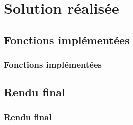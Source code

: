 \section{Solution r\'ealis\'ee}

\subsection{Fonctions impl\'ement\'ees}
\frame
{
\frametitle{Fonctions impl\'ement\'ees}


}

\subsection{Rendu final}
\frame
{
\frametitle{Rendu final}


}